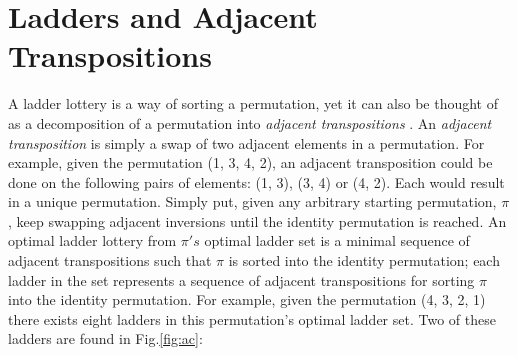 \section{Ladders and Adjacent Transpositions}
A ladder lottery is a way of sorting a permutation, yet it can also be thought of as 
a decomposition of a permutation into \emph{adjacent transpositions} \cite{A1}. 
An \emph{adjacent transposition} is simply a swap of two adjacent elements in a 
permutation. For example, given the permutation (1, 3, 4, 2), an adjacent 
transposition could be done on the following pairs of elements: 
(1, 3), (3, 4) or (4, 2). Each would result in a unique permutation. 
Simply put, given any arbitrary starting permutation, $\pi$, keep swapping 
adjacent inversions until the identity permutation is reached.  An optimal 
ladder lottery from $\pi's$ optimal ladder set is a minimal sequence of 
adjacent transpositions such that $\pi$ is sorted into the identity permutation; 
each ladder in the set represents a sequence of adjacent transpositions for 
sorting $\pi$ into the identity permutation. For example, given the permutation 
(4, 3, 2, 1) there exists eight ladders in this permutation's optimal ladder set. 
Two of these ladders are found in Fig.\ref{fig:ac}:

